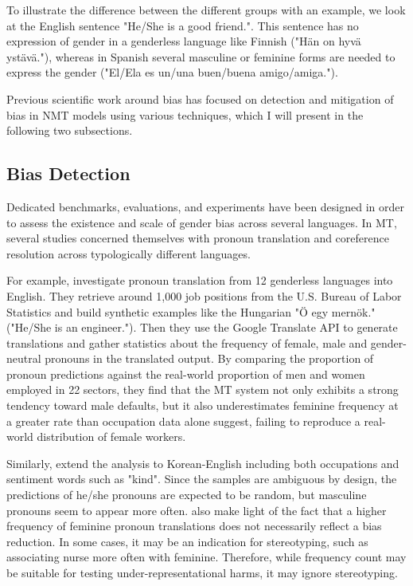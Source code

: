 To illustrate the difference between the different groups with an example, we look at the English sentence "He/She is a good friend.". This sentence has no expression of gender in a genderless language like Finnish ("Hän on hyvä ystävä."), whereas in Spanish several masculine or feminine forms are needed to express the gender ("El/Ela es un/una buen/buena amigo/amiga."). 

Previous scientific work around bias has focused on detection and mitigation of bias in NMT models using various techniques, which I will present in the following two subsections. 

\subsection{Bias Detection}
\label{sec:Background:Bias_Detection}

Dedicated benchmarks, evaluations, and experiments have been designed in order to assess the existence and scale of gender bias across several languages. In MT, several studies concerned themselves with pronoun translation and coreference resolution across typologically different languages. 

For example, \citet{Prates_2019} investigate pronoun translation from 12 genderless languages into English. They retrieve around 1,000 job positions from the U.S. Bureau of Labor Statistics and build synthetic examples like the Hungarian "Ö egy mernök." ("He/She is an engineer."). Then they use the Google Translate API to generate translations and gather statistics about the frequency of female, male and gender-neutral pronouns in the translated output. By comparing the proportion of pronoun predictions against the real-world proportion of men and women employed in 22 sectors, they find that the MT system not only exhibits a strong tendency toward male defaults, but it also underestimates feminine frequency at a greater rate than occupation data alone suggest, failing to reproduce a real-world distribution of female workers.

Similarly, \citet{Cho_2019} extend the analysis to Korean-English including both occupations and sentiment words such as "kind". Since the samples are ambiguous by design, the predictions of he/she pronouns are expected to be random, but masculine pronouns seem to appear more often. \citet{Cho_2019} also make light of the fact that a higher frequency of feminine pronoun translations does not necessarily reflect a bias reduction. In some cases, it may be an indication for stereotyping, such as associating nurse more often with feminine. Therefore, while frequency count may be suitable for testing under-representational harms, it may ignore stereotyping.

